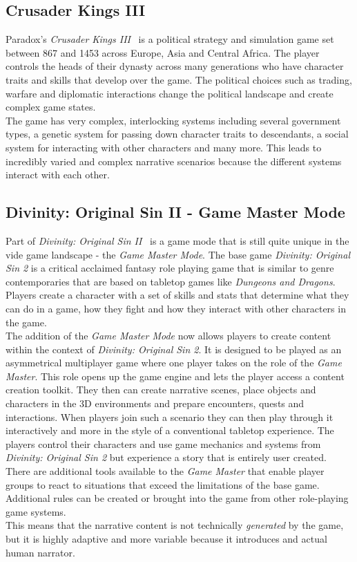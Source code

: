 \subsection{Crusader Kings III}
Paradox's \textit{Crusader Kings III}~\cite{crusader} is a political strategy and simulation game set between 867 and 1453 across Europe, Asia and Central Africa. The player controls the heads of their dynasty across many generations who have character traits and skills that develop over the game. The political choices such as trading, warfare and diplomatic interactions change the political landscape and create complex game states.\\
The game has very complex, interlocking systems including several government types, a genetic system for passing down character traits to descendants, a social system for interacting with other characters and many more. This leads to incredibly varied and complex narrative scenarios because the different systems interact with each other.
\subsection{Divinity: Original Sin II - Game Master Mode}
Part of \textit{Divinity: Original Sin II}~\cite{divinity} is a game mode that is still quite unique in the vide game landscape - the \textit{Game Master Mode}. The base game \textit{Divinity: Original Sin 2} is a critical acclaimed fantasy role playing game that is similar to genre contemporaries that are based on tabletop games like \textit{Dungeons and Dragons}. Players create a character with a set of skills and stats that determine what they can do in a game, how they fight and how they interact with other characters in the game.\\
The addition of the \textit{Game Master Mode} now allows players to create content within the context of \textit{Divinity: Original Sin 2}. It is designed to be played as an asymmetrical multiplayer game where one player takes on the role of the \textit{Game Master}. This role opens up the game engine and lets the player access a content creation toolkit. They then can create narrative scenes, place objects and characters in the 3D environments and prepare encounters, quests and interactions. When players join such a scenario they can then play through it interactively and more in the style of a conventional tabletop experience. The players control their characters and use game mechanics and systems from \textit{Divinity: Original Sin 2} but experience a story that is entirely user created. There are additional tools available to the \textit{Game Master} that enable player groups to react to situations that exceed the limitations of the base game. Additional rules can be created or brought into the game from other role-playing game systems.\\
This means that the narrative content is not technically \textit{generated} by the game, but it is highly adaptive and more variable because it introduces and actual human narrator.
